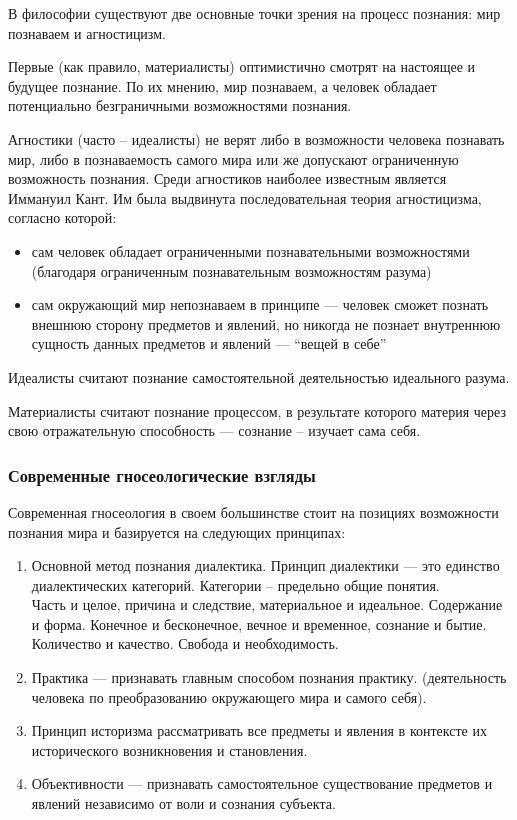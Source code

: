 \documentclass[a4paper, 14pt]{extreport}
\begin{document}
В философии существуют две основные точки зрения на процесс познания:
мир познаваем и агностицизм.

Первые (как правило, материалисты) оптимистично смотрят на настоящее и
будущее познание. По их мнению, мир познаваем, а человек обладает
потенциально безграничными возможностями познания.

Агностики (часто -- идеалисты) не верят либо в возможности человека
познавать мир, либо в познаваемость самого мира или же допускают
ограниченную возможность познания. Среди агностиков наиболее известным
является Иммануил Кант. Им была выдвинута последовательная теория
агностицизма, согласно которой:

\begin{itemize}
\item
  сам человек обладает ограниченными познавательными возможностями
  (благодаря ограниченным познавательным возможностям разума)
\item
  сам окружающий мир непознаваем в принципе --- человек сможет познать
  внешнюю сторону предметов и явлений, но никогда не познает внутреннюю
  сущность данных предметов и явлений --- ``вещей в себе''
\end{itemize}

Идеалисты считают познание самостоятельной деятельностью идеального
разума.

Материалисты считают познание процессом, в результате которого материя
через свою отражательную способность --- сознание -- изучает сама себя.

\subsubsection{Современные гносеологические взгляды}

Современная гносеология в своем большинстве стоит на позициях
возможности познания мира и базируется на следующих принципах:

\begin{enumerate}
\def\labelenumi{\arabic{enumi}.}

\item
  Основной метод познания диалектика. Принцип диалектики --- это
  единство диалектических категорий. Категории -- предельно общие
  понятия.\\
  Часть и целое, причина и следствие, материальное и идеальное.
  Содержание и форма. Конечное и бесконечное, вечное и временное,
  сознание и бытие. Количество и качество. Свобода и необходимость.
\item
  Практика --- признавать главным способом познания практику.
  (деятельность человека по преобразованию окружающего мира и самого
  себя).
\item
  Принцип историзма рассматривать все предметы и явления в контексте их
  исторического возникновения и становления.
\item
  Объективности --- признавать самостоятельное существование предметов и
  явлений независимо от воли и сознания субъекта.
\end{enumerate}
\end{document}
